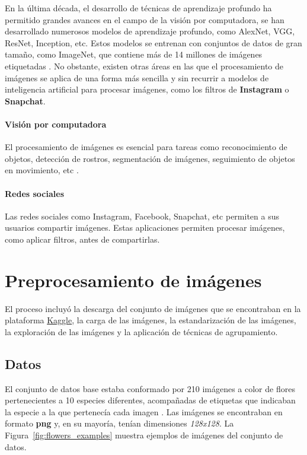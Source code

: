 \documentclass{article}
\begin{document}
En la última década, el desarrollo de técnicas de aprendizaje profundo ha permitido grandes avances en el campo de la visión por computadora, se han desarrollado numerosos modelos de aprendizaje profundo, como AlexNet, VGG, ResNet, Inception, etc. Estos modelos se entrenan con conjuntos de datos de gran tamaño, como ImageNet, que contiene más de 14 millones de imágenes etiquetadas \cite{HandsonML}. No obstante, existen otras áreas en las que el procesamiento de imágenes se aplica de una forma más sencilla y sin recurrir a modelos de inteligencia artificial para procesar imágenes, como los filtros de \textbf{Instagram} o \textbf{Snapchat}.

\paragraph{Visión por computadora}

El procesamiento de imágenes es esencial para tareas como reconocimiento de objetos, detección de rostros, segmentación de imágenes, seguimiento de objetos en movimiento, etc \cite{HandsonML}.

\paragraph{Redes sociales}
Las redes sociales como Instagram, Facebook, Snapchat, etc permiten a sus usuarios compartir imágenes. Estas aplicaciones permiten procesar imágenes, como aplicar filtros, antes de compartirlas.

\section{Preprocesamiento de imágenes}
El proceso incluyó la descarga del conjunto de imágenes que se encontraban en la plataforma \href{https://www.kaggle.com/datasets/olgabelitskaya/flower-color-images}{Kaggle}, la carga de las imágenes, la estandarización de las imágenes, la exploración de las imágenes y la aplicación de técnicas de agrupamiento.


\subsection{Datos}

El conjunto de datos base estaba conformado por 210 imágenes a color de flores pertenecientes a 10 especies diferentes, acompañadas de etiquetas que indicaban la especie a la que pertenecía cada imagen \cite{Kaggle}. Las imágenes se encontraban en formato \textbf{png} y, en su mayoría, tenían dimensiones \textit{128x128}. La Figura~\ref{fig:flowers_examples} muestra ejemplos de imágenes del conjunto de datos.
\end{document}
